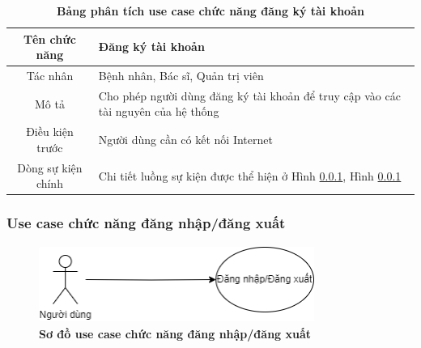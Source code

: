  \begin{table}[H]
    \caption{\bfseries \fontsize{12pt}{0pt}\selectfont Bảng phân tích use case chức năng đăng ký tài khoản}
    \centering
    \begin{tabularx}{0.9\textwidth}{|c|X|}
      \hline
      \textbf{Tên chức năng} & \textbf{Đăng ký tài khoản} \\
      \hline
      Tác nhân & Bệnh nhân, Bác sĩ, Quản trị viên \\
      \hline
      Mô tả & Cho phép người dùng đăng ký tài khoản để truy cập vào các tài nguyên của hệ thống 
       \\
      \hline
      Điều kiện trước & Người dùng cần có kết nối Internet \\
      \hline
      Dòng sự kiện chính & 
        Chi tiết luồng sự kiện được thể hiện ở Hình \ref{}, Hình \ref{} 
        \\
      \hline
    \end{tabularx}
  \end{table}

\subsubsection{Use case chức năng đăng nhập/đăng xuất }
  \begin{figure}[H]
    \centering
    \includegraphics[width=9cm,height=2.5cm]{Images/use_case/use_case_login.png}
    \caption[Sơ đồ use case chức năng đăng nhập/đăng xuất]{\bfseries \fontsize{12pt}{0pt}
    \selectfont Sơ đồ use case chức năng đăng nhập/đăng xuất}
    \label{use_case_login_logout} %
  \end{figure}

